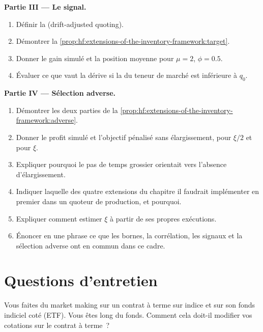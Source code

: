 \begin{problem}
\medskip\noindent\textbf{Partie III --- Le signal.}
\begin{enumerate}[resume]
\item Définir la  (drift-adjusted quoting).
\item Démontrer la \cref{prop:hf:extensions-of-the-inventory-framework:target}.
\item Donner le gain simulé et la position moyenne pour $\mu=2$, $\phi=0.5$.
\item Évaluer ce que vaut la dérive si la  du teneur de marché est inférieure à $q_0$.
\end{enumerate}

\medskip\noindent\textbf{Partie IV --- Sélection adverse.}
\begin{enumerate}[resume]
\item Démontrer les deux parties de la \cref{prop:hf:extensions-of-the-inventory-framework:adverse}.
\item Donner le profit simulé et l'objectif pénalisé sans élargissement, pour $\xi/2$ et pour $\xi$.
\item Expliquer pourquoi le pas de temps grossier orientait vers l'absence d'élargissement.
\item Indiquer laquelle des quatre extensions du chapitre il faudrait implémenter en premier dans un quoteur de production, et pourquoi.
\item Expliquer comment estimer $\xi$ à partir de ses propres exécutions.
\item Énoncer en une phrase ce que les bornes, la corrélation, les signaux et la sélection adverse ont en commun dans ce cadre.
\end{enumerate}
\end{problem}

\section{Questions d'entretien}

\begin{interviewq}\label{iq:hf:extensions-of-the-inventory-framework:1}
Vous faites du market making sur un contrat à terme sur indice et sur son fonds indiciel coté (ETF). Vous êtes long du fonds. Comment cela doit-il modifier vos cotations sur le contrat à terme~?
\end{interviewq}

